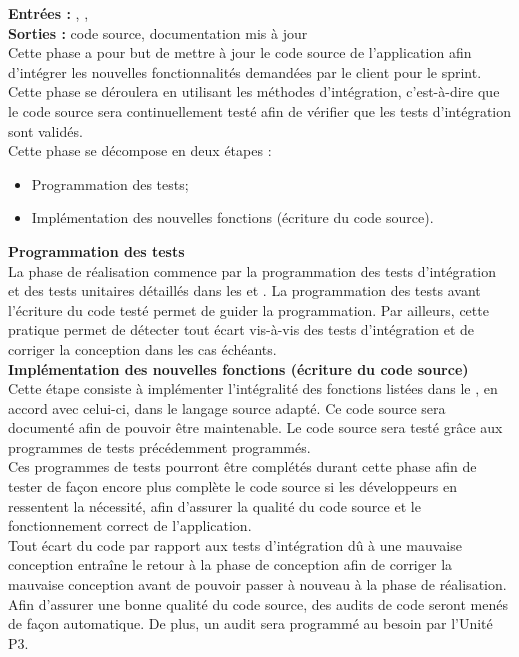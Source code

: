 \textbf{Entrées :} \DCCourt , \PTUCourt , \PTICourt \\
\textbf{Sorties :} code source, documentation mis à jour \\
Cette phase a pour but de mettre à jour le code source de l’application afin d’intégrer les nouvelles fonctionnalités demandées par le client pour le sprint. Cette phase se déroulera en utilisant les méthodes d’intégration, c’est-à-dire que le code source sera continuellement testé afin de vérifier que les tests d’intégration sont validés.\\ 
Cette phase se décompose en deux étapes :
\begin{itemize}
\item Programmation des tests;
\item Implémentation des nouvelles fonctions (écriture du code source).
\end{itemize}

\textbf{Programmation des tests} \\

La phase de réalisation commence par la programmation des tests d’intégration et des tests unitaires détaillés dans les \PTICourt{} et \PTUCourt . 
La programmation des tests avant l’écriture du code testé permet de guider la programmation. 
Par ailleurs, cette pratique permet de détecter tout écart vis-à-vis des tests d’intégration et de corriger la conception dans les cas échéants.\\

\textbf{Implémentation des nouvelles fonctions (écriture du code source)} \\

Cette étape consiste à implémenter l’intégralité des fonctions listées dans le \DCCourt, en accord avec celui-ci, dans le langage source adapté. Ce code source sera documenté afin de pouvoir être maintenable.
Le code source sera testé grâce aux programmes de tests précédemment programmés.\\
Ces programmes de tests pourront être complétés durant cette phase afin de tester de façon encore plus complète le code source si les développeurs en ressentent la nécessité, afin d’assurer la qualité du code source et le fonctionnement correct de l’application. \\
Tout écart du code par rapport aux tests d’intégration dû à une mauvaise conception entraîne le retour à la phase de conception afin de corriger la mauvaise conception avant de pouvoir passer à nouveau à la phase de réalisation.
Afin d’assurer une bonne qualité du code source, des audits de code seront menés de façon automatique. De plus, un audit sera programmé au besoin par l’Unité P3.


